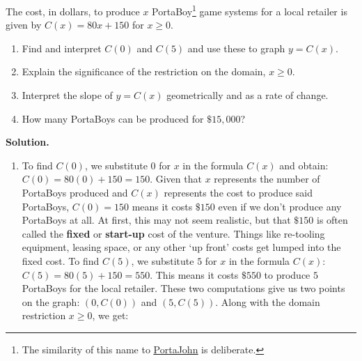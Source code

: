 \documentclass{ximera}
\begin{document}
\begin{example} \label{PortaBoyCost} The cost, in dollars, to produce $x$ PortaBoy\footnote{The similarity of this name to \href{http://www.toilets.com}{\underline{PortaJohn}} is deliberate.} game systems for a local retailer is given by   $C(x) = 80x + 150$ for $x \geq 0$.  

\begin{enumerate}

\item  Find and interpret $C(0)$ and $C(5)$ and use these to graph $y = C(x)$.

\item  Explain the significance of the restriction on the domain, $x \geq 0$.

\item  Interpret the slope of $y = C(x)$ geometrically and as a rate of change.

\item How many PortaBoys can be produced for $\$15,\! 000$?  

\end{enumerate}

\smallskip

{\bf Solution.}  

\begin{enumerate}

\item  To find $C(0)$, we substitute $0$ for $x$ in the formula $C(x)$ and obtain: $C(0) = 80(0) + 150 = 150$.  Given that $x$ represents the number of PortaBoys produced and $C(x)$ represents the cost to produce said PortaBoys, $C(0) = 150$ means it costs $\$150$ even if we don't produce any PortaBoys at all.  At first, this may not seem realistic, but that $\$150$ is often called the \textbf{fixed} or \textbf{start-up} cost of the venture.  Things like re-tooling equipment, leasing space, or any other `up front' costs get lumped into the fixed cost.  To find $C(5)$, we substitute $5$ for  $x$  in the formula $C(x)$:   $C(5) = 80(5)+150 = 550$.  This  means it costs $\$550$ to produce $5$ PortaBoys for the local retailer.  These two computations give us two points on the graph: $(0, C(0))$ and $(5, C(5))$.  Along with the domain restriction $x \geq 0$, we get:


\begin{center}



\end{center}
\end{enumerate}
\end{example}
\end{document}

